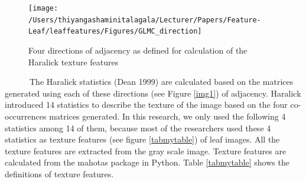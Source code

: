 \documentclass{article}
\begin{document}
\begin{figure}[!ht]

{\centering \texttt{[image: /Users/thiyangashaminitalagala/Lecturer/Papers/Feature-Leaf/leaffeatures/Figures/GLMC\_direction]} 

}

\caption{\label{direction}Four directions of adjacency as defined for calculation of the Haralick texture features}\label{fig:unnamed-chunk-24}
\end{figure}

~~~~~~The Haralick statistics (Dean 1999) are calculated based on the
matrices generated using each of these directions (see Figure
\ref{img1}) of adjacency. Haralick introduced 14 statistics to describe
the texture of the image based on the four co-occurrences matrices
generated. In this research, we only used the following 4 statistics
among 14 of them, because most of the researchers used these 4
statistics as texture features (see figure \ref{tabmytable}) of leaf
images. All the texture features are extracted from the gray scale
image. Texture features are calculated from the mahotas package in
Python. Table \ref{tabmytable} shows the definitions of texture
features.
\end{document}

